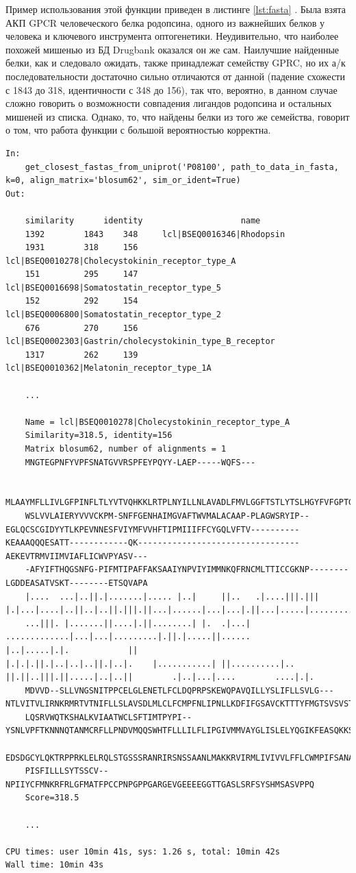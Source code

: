 \documentclass[a4paper,14pt]{article}         %
\begin{document}
Пример использования этой функции приведен в листинге \ref{lst:fasta}
\color{black}. Была взята АКП GPCR человеческого белка родопсина, одного из важнейших белков у человека и ключевого инструмента оптогенетики. Неудивительно, что наиболее похожей мишенью из БД Drugbank оказался он же сам. Наилучшие найденные белки, как и следовало ожидать, также принадлежат семейству GPRC, но их а/к последовательности достаточно сильно отличаются от данной (падение схожести с 1843 до 318, идентичности с 348 до 156), так что, вероятно, в данном случае сложно говорить о возможности совпадения лигандов родопсина и остальных мишеней из списка. Однако, то, что найдены белки из того же семейства, говорит о том, что работа функции с большой вероятностью корректна.
\begin{lstlisting}[label={lst:fasta}, caption={Определение сходства мишеней по а/к последовательности посредством Biopython, входные данные~--- ID Uniptor человеческого родопсина из семейства GPCR.}]
In:
	get_closest_fastas_from_uniprot('P08100', path_to_data_in_fasta, k=0, align_matrix='blosum62', sim_or_ident=True)
Out:

	similarity 		identity 					name
	1392 	 	1843 	348  	lcl|BSEQ0016346|Rhodopsin
	1931 	 	318 	156 	lcl|BSEQ0010278|Cholecystokinin_receptor_type_A
	151 	 	295 	147 	lcl|BSEQ0016698|Somatostatin_receptor_type_5
	152 	 	292 	154 	lcl|BSEQ0006800|Somatostatin_receptor_type_2
	676 	 	270 	156 	lcl|BSEQ0002303|Gastrin/cholecystokinin_type_B_receptor
	1317 	 	262 	139 	lcl|BSEQ0010362|Melatonin_receptor_type_1A

	...
	
	Name = lcl|BSEQ0010278|Cholecystokinin_receptor_type_A
	Similarity=318.5, identity=156
	Matrix blosum62, number of alignments = 1
	MNGTEGPNFYVPFSNATGVVRSPFEYPQYY-LAEP-----WQFS---
	
	MLAAYMFLLIVLGFPINFLTLYVTVQHKKLRTPLNYILLNLAVADLFMVLGGFTSTLYTSLHGYFVFGPTGCNLEGFFATLGGEIAL	
	WSLVVLAIERYVVVCKPM-SNFFGENHAIMGVAFTWVMALACAAP-PLAGWSRYIP--EGLQCSCGIDYYTLKPEVNNESFVIYMFVVHFTIPMIIIFFCYGQLVFTV----------KEAAAQQQESATT------------QK---------------------------------AEKEVTRMVIIMVIAFLICWVPYASV---
	-AFYIFTHQGSNFG-PIFMTIPAFFAKSAAIYNPVIYIMMNKQFRNCMLTTICCGKNP--------LGDDEASATVSKT--------ETSQVAPA
	|....  ...|..||.|.......|..... |..|     ||..   .|....|||.|||   |.|...|....|..||..|..||.|||.||...|......|...|...|.||...|.....|...........||....|||
	...|||. |.......||....|.||........| |.  .|...|  .............|...|...|.........|.||.|.....||......          |..|.....|.|.            ||                                 |.|.|.||.|..|..|..||.|..|.    |...........| ||..........|..  ||.||..|||.||.....|..|..||        .|..|...|....        ....|.|.
	MDVVD--SLLVNGSNITPPCELGLENETLFCLDQPRPSKEWQPAVQILLYSLIFLLSVLG---NTLVITVLIRNKRMRTVTNIFLLSLAVSDLMLCLFCMPFNLIPNLLKDFIFGSAVCKTTTYFMGTSVSVSTFNLVAISLERYGAICKP
	LQSRVWQTKSHALKVIAATWCLSFTIMTPYPI--YSNLVPFTKNNNQTANMCRFLLPNDVMQQSWHTFLLLILFLIPGIVMMVAYGLISLELYQGIKFEASQKKSAKERKPSTTSSGKY
	EDSDGCYLQKTRPPRKLELRQLSTGSSSRANRIRSNSSAANLMAKKRVIRMLIVIVVLFFLCWMPIFSANAWRAYDTASAERRLSGT
	PISFILLLSYTSSCV--NPIIYCFMNKRFRLGFMATFPCCPNPGPPGARGEVGEEEEGGTTGASLSRFSYSHMSASVPPQ
	Score=318.5
	
	...
	
CPU times: user 10min 41s, sys: 1.26 s, total: 10min 42s
Wall time: 10min 43s
\end{lstlisting}
\end{document}
